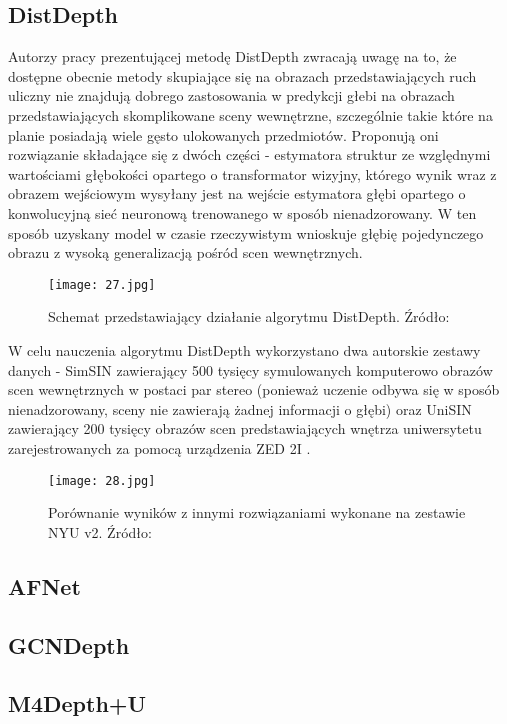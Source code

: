 \subsection{DistDepth}
Autorzy pracy prezentującej metodę DistDepth \cite{wu2022practical} zwracają uwagę na to, że dostępne obecnie metody skupiające się na obrazach przedstawiających ruch uliczny nie znajdują dobrego zastosowania w predykcji głebi na obrazach przedstawiających skomplikowane sceny wewnętrzne, szczególnie takie które na planie posiadają wiele gęsto ulokowanych przedmiotów. Proponują oni rozwiązanie składające się z dwóch części - estymatora struktur ze względnymi wartościami głębokości opartego o transformator wizyjny, którego wynik wraz z obrazem wejściowym wysyłany jest na wejście estymatora głębi opartego o konwolucyjną sieć neuronową trenowanego w sposób nienadzorowany. W ten sposób uzyskany model w czasie rzeczywistym wnioskuje głębię pojedynczego obrazu z wysoką generalizacją pośród scen wewnętrznych.
\begin{figure}[H]
    \centering
    \texttt{[image: 27.jpg]}
    \caption{Schemat przedstawiający działanie algorytmu DistDepth. Źródło: \cite{wu2022practical}}
    \label{fig:distdepth-teaser}
\end{figure}
W celu nauczenia algorytmu DistDepth wykorzystano dwa autorskie zestawy danych - SimSIN zawierający 500 tysięcy symulowanych komputerowo obrazów scen wewnętrznych w postaci par stereo (ponieważ uczenie odbywa się w sposób nienadzorowany, sceny nie zawierają żadnej informacji o głębi) oraz UniSIN zawierający 200 tysięcy obrazów scen predstawiających wnętrza uniwersytetu zarejestrowanych za pomocą urządzenia ZED 2I \cite{ZED2I}.
\begin{figure}[H]
    \centering
    \texttt{[image: 28.jpg]}
    \caption{Porównanie wyników z innymi rozwiązaniami wykonane na zestawie NYU v2. Źródło: \cite{wu2022practical}}
    \label{fig:distdepth-results}
\end{figure}

\subsection{AFNet}

\subsection{GCNDepth}

\subsection{M4Depth+U}

